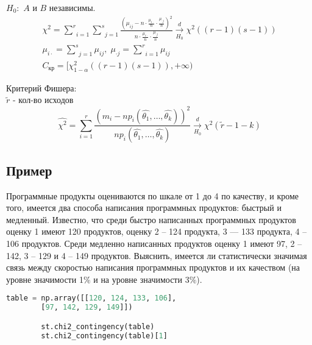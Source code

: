 $H_0:$ $A$ и $B$ независимы.
$$\begin{gathered}
	\chi^2 = \underset{i=1}{\overset{r}{\sum}}\underset{j=1}{\overset{s}{\sum}}\frac{\left( \mu_{ij} - n \cdot \frac{\mu_{i \cdot}}{n} \cdot \frac{\mu_{\cdot j}}{n} \right)^2}{n \cdot \frac{\mu_{i \cdot}}{n} \cdot \frac{\mu_{\cdot j}}{n}} \xrightarrow[H_0]{d} \chi^2 \left( (r-1)(s-1) \right) \\
	\mu_{i \cdot} = \underset{j=1}{\overset{s}{\sum}}\mu_{ij}, \; \mu_{\cdot j} = \underset{i=1}{\overset{r}{\sum}}\mu_{ij} \\
	C_{\text{кр}} = [ \chi_{1-\alpha}^2 \left( (r-1)(s-1) \right), +\infty)
\end{gathered}$$

\hfill \break \hfill \break
Критерий Фишера:\\
$\tilde{r}$ - кол-во исходов
$$\hat{\chi^2} = \underset{i=1}{\overset{r}{\sum}}\frac{\left( m_i - n p_i (\hat{\theta_1}, \dots, \hat{\theta_k}) \right)^2}{n p_i (\hat{\theta_1}, \dots, \hat{\theta_k})} \xrightarrow[H_0]{d} \chi^2 (\tilde{r}-1-k) $$

\subsection*{Пример}\label{cha:corr/sec:contingency/subsec:prob}

\begin{problem}
	 Программные продукты оцениваются по шкале от 1 до 4 по качеству, и кроме того, имеется два способа написания программных продуктов: быстрый и медленный. Известно, что среди быстро написанных программных продуктов оценку 1 имеют 120 продуктов, оценку 2 – 124 продукта, 3 — 133 продукта, 4 – 106 продуктов. Среди медленно написанных продуктов оценку 1 имеют 97, 2 – 142, 3 – 129 и 4 – 149 продуктов. Выяснить, имеется ли статистически значимая связь между скоростью написания программных продуктов и их качеством (на уровне значимости 1$\%$ и на уровне значимости 3$\%$).
\end{problem}
\begin{solution}
	\begin{lstlisting}[language=Python]
		table = np.array([[120, 124, 133, 106],
		[97, 142, 129, 149]])

		st.chi2_contingency(table)
		st.chi2_contingency(table)[1]
	\end{lstlisting}
\end{solution}


